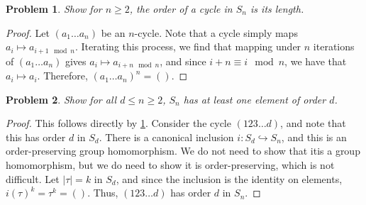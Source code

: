 \documentclass[11pt, letterpaper]{article}
\theoremstyle{plain}
\newtheorem{problem}{Problem}[section]
\begin{document}
\begin{problem}\label{6.1}
	Show for $n\geq 2$, the order of a cycle in $S_n$ is its length.
\end{problem}
\begin{proof}
	Let $(a_1 \ldots a_n)$ be an $n$-cycle. Note that a cycle simply maps $a_i \mapsto a_{i+1\mod{n}} $. Iterating this process, we find that mapping under $n$ iterations of $(a_1 \ldots a_n)$ gives $a_i \mapsto a_{i+n\mod{n}} $, and since $i+n\equiv i\mod{n}$, we have that $a_i\mapsto a_i$. Therefore, $(a_1 \ldots a_n)^n=( )$.
\end{proof}
\begin{problem}
	Show for all $d\leq n\geq 2$, $S_n$ has at least one element of order $d$.
\end{problem}
\begin{proof}
	This follows directly by \cref{6.1}. Consider the cycle $(123\ldots d)$, and note that this has order $d$ in $S_d$. There is a canonical inclusion $i:S_d\hookrightarrow S_n$, and this is an order-preserving group homomorphism. We do not need to show that itis a group homomorphism, but we do need to show it is order-preserving, which is not difficult. Let $\left| \tau  \right| =k$ in $S_d$, and since the inclusion is the identity on elements, $i(\tau )^k=\tau ^k=( )$. Thus, $(123\ldots d)$ has order $d$ in $S_n$.	
\end{proof}
\end{document}
